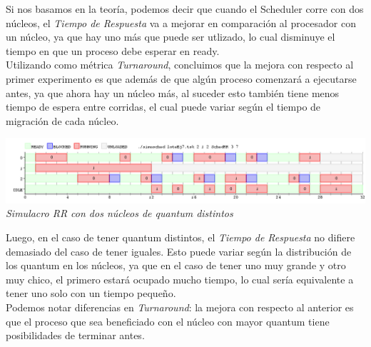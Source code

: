 Si nos basamos en la teor\'ia, podemos decir que cuando el Scheduler corre con dos n\'ucleos, el \textit{Tiempo de Respuesta} va a mejorar en comparaci\'on al procesador con un n\'ucleo, ya que hay uno m\'as que puede ser utlizado, lo cual disminuye el tiempo en que un proceso debe esperar en ready.\\
Utilizando como m\'etrica \textit{Turnaround}, concluimos que la mejora con respecto al primer experimento es que adem\'as de que alg\'un proceso comenzar\'a a ejecutarse antes, ya que ahora hay un n\'ucleo m\'as, al suceder esto tambi\'en tiene menos tiempo de espera entre corridas, el cual puede variar seg\'un el tiempo de migraci\'on de cada n\'ucleo.


\vspace{\baselineskip}
\begin{center}
\includegraphics[scale=0.45]{../tp1/Test/resEj7Co2dis.png}
\\
\vspace{1pt}
\footnotesize\textit{Simulacro RR con dos n\'ucleos de quantum distintos}
\end{center}
\vspace{\baselineskip}

Luego, en el caso de tener quantum distintos, el \textit{Tiempo de Respuesta} no difiere demasiado del caso de tener iguales. Esto puede variar seg\'un la distribuci\'on de los quantum en los n\'ucleos, ya que en el caso de tener uno muy grande y otro muy chico, el primero estar\'a ocupado mucho tiempo, lo cual ser\'ia equivalente a tener uno solo con un tiempo peque\~no.\\
Podemos notar diferencias en \textit{Turnaround}: la mejora con respecto al anterior es que el proceso que sea beneficiado con el n\'ucleo con mayor quantum tiene posibilidades de terminar antes.


